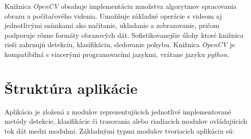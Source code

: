         Knižnica \emph{OpenCV} obsahuje implementáciu množstva algorytmov spracovania obrazu a počítačového videnia. Umožňuje základné operácie s videom aj jednotlivými snímkami ako načítanie, ukladanie a zobrazovanie, pričom podporuje rôzne formáty obrazových dát. Sofistikovanejšie úlohy ktoré knižnica rieši zahrnujú detekciu, klasifikáciu, sledovanie pohybu. Knižnica \emph{OpenCV} je kompatibilná s viacerými programovacími jazykmi, vrátane jazyku \emph{python}.

    \section{Štruktúra aplikácie}

        Aplikácia je zložená z modulov reprezentujúcich jednotlivé implementované metódy detekcie, klasifikácie či trasovania alebo riadiacich modulov ovládajúcich tok dát medzi modulmi. Základnými typmi modulov tvoriacich aplikáciu sú:
